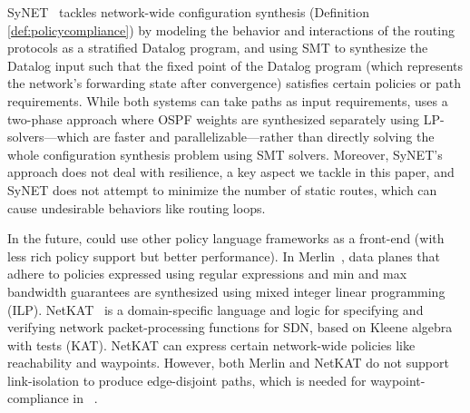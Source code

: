 SyNET~\cite{synet} tackles network-wide configuration synthesis
(Definition \ref{def:policycompliance}) by
modeling the behavior and interactions of the routing protocols as a
stratified Datalog program, and using SMT to synthesize the Datalog
input such that the fixed point of the Datalog program (which
represents the network's forwarding state after convergence) 
satisfies certain policies or path requirements.  While
both systems can take paths as input requirements, \name uses
a two-phase approach where OSPF weights are synthesized
separately using
LP-solvers---which are faster and parallelizable---rather than directly  
solving the whole configuration synthesis problem using SMT solvers.  
Moreover, SyNET's approach
does not deal with resilience, a key aspect we tackle in this paper,
and SyNET does not attempt to minimize the number of static routes,
which can cause undesirable behaviors like routing loops.  


In the future, \name could use
other policy language frameworks as a front-end (with 
less rich policy support but better
performance). %
In Merlin~\cite{merlin}, data planes that adhere to policies expressed
using regular expressions and min and max
bandwidth guarantees are synthesized using mixed
integer linear programming (ILP). 
NetKAT~\cite{netkat} is a domain-specific language and logic for 
specifying and verifying network packet-processing functions
for SDN, based on Kleene algebra with tests (KAT). NetKAT can  
express certain network-wide policies like reachability and waypoints.
However, both Merlin and NetKAT do not support link-isolation 
to produce edge-disjoint paths, which is needed 
for waypoint-compliance in ~.


